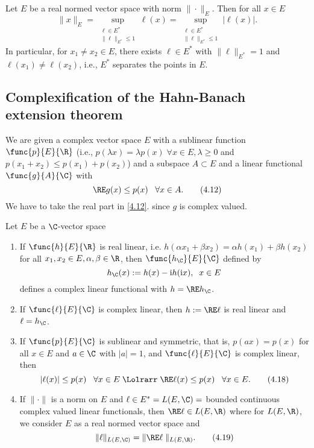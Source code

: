 \begin{cor}\label{iv.3}
    Let $E$ be a real normed vector space with norm $\|\cdot\|_E$. Then for all $x\in E$
    \[\|x\|_E=\sup_{\substack{\ell\in E^*\\\|\ell\|_{E^*}\leq 1}}\ell(x)=\sup_{\substack{\ell\in E^*\\\|\ell\|_{E^*}\leq 1}}|\ell(x)|.\tag{4.8}\label{4.8}\]
    In particular, for $x_1\neq x_2\in E$, there exists $\ell\in E^*$ with $\|\ell\|_{E^*}=1$ and $\ell(x_1)\neq\ell(x_2)$, i.e., $E^*$ separates the points in $E$.
\end{cor}

\subsection{Complexification of the Hahn-Banach extension theorem}
 We are given a complex vector space $E$ with a sublinear function $\func{p}{E}{\R}$ (i.e., $p(\lambda x)=\lambda p(x)\;\forall x\in E,\lambda\geq0$ and $p(x_1+x_2)\leq p(x_1)+p(x_2)$) and a subspace $A\subset E$ and a linear functional $\func{g}{A}{\C}$ with
\[\RE g(x)\leq p(x)\;\;\;\forall x\in A.\tag{4.12}\label{4.12}\]
We have to take the real part in \eqref{4.12}. since $g$ is complex valued.

\begin{lem}\label{iv.4}
    Let $E$ be a $\C$-vector space
    \begin{enumerate}[label=\alph*)]
        \item If $\func{h}{E}{\R}$ is real linear, i.e. $h(\alpha x_1+\beta x_2)=\alpha h(x_1)+\beta h(x_2)$ for all $x_1,x_2\in E,\alpha,\beta\in\R$, then $\func{h_\C}{E}{\C}$ defined by 
        \[h_\C(x):=h(x)-\mathrm{i}h(\mathrm{i}x),\;\;x\in E\]
        defines a complex linear functional with $h=\RE h_\C$.\label{iv.4.a}
        \item If $\func{\ell}{E}{\C}$ is complex linear, then $h:=\RE\ell$ is real linear and $\ell=h_\C$.\label{iv.4.b}
        \item If $\func{p}{E}{\C}$ is sublinear and symmetric, that is, $p(ax)=p(x)$ for all $x\in E$ and $a\in \C$ with $|a|=1$, and $\func{\ell}{E}{\C}$ is complex linear, then
        \[|\ell(x)|\leq p(x)\;\;\;\forall x\in E\;\Lolrarr\;\RE\ell(x)\leq p(x)\;\;\;\forall x\in E.\tag{4.18}\label{4.18}\]\label{iv.4.c}
        \item If $\|\cdot\|$ is a norm on $E$ and $\ell\in E^*=L(E,\C)=$ bounded continuous complex valued linear functionals, then $\RE\ell\in L(E,\R)$ \rec{(}where for $L(E,\R)$, we consider $E$ as a real normed vector space\rec{)} and
        \[\|\ell\|_{L(E,\C)}=\|\RE\ell\;\|_{L(E,\R)}.\tag{4.19}\label{4.19}\]\label{iv.4.d}
    \end{enumerate}
\end{lem}

